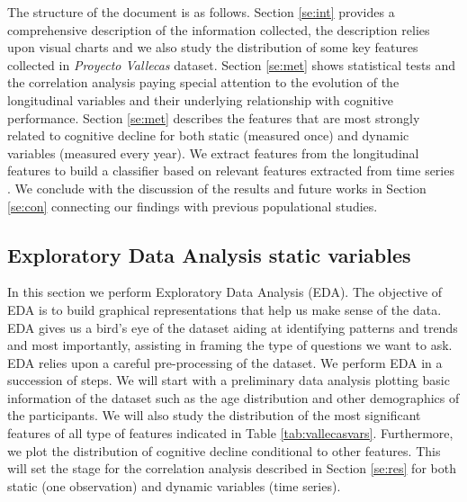 \documentclass[11pt]{article}
\theoremstyle{definition}
\theoremstyle{remark}
\begin{document}
The structure of the document is as follows. Section \ref{se:int} provides a comprehensive description of the information collected, the description relies upon visual charts and we also study the distribution of some key features collected in \emph{Proyecto Vallecas} dataset.
Section \ref{se:met} shows statistical tests and the correlation analysis paying special attention to the evolution of the longitudinal variables and their underlying relationship with cognitive performance. 
Section \ref{se:met} describes the features that are most strongly related to cognitive decline for both static (measured once) and dynamic variables (measured every year). We extract features from the longitudinal features to build a classifier based on relevant features extracted from time series \cite{christ2018time}. We conclude with the discussion of the results and future works in Section \ref{se:con} connecting our findings with previous populational studies.  



\subsection{Exploratory Data Analysis static variables}
\label{sse:eda}
In this section we perform Exploratory Data Analysis (EDA). The objective of EDA is to build graphical representations that help us make sense of the data. EDA gives us a bird's eye of the dataset aiding at identifying patterns and trends and most importantly, assisting in framing the type of questions we want to ask.
EDA relies upon a careful pre-processing of the dataset. We perform EDA in a succession of steps. We will start with a preliminary data analysis plotting basic information of the dataset such as the age distribution and other demographics of the participants. 
We will also study the distribution of the most significant features of all type of features indicated in Table \ref{tab:vallecasvars}. Furthermore, we plot the distribution of cognitive decline conditional to other features. This will set the stage for the correlation analysis described in Section \ref{se:res} for both static (one observation) and dynamic variables (time series).
\end{document}
